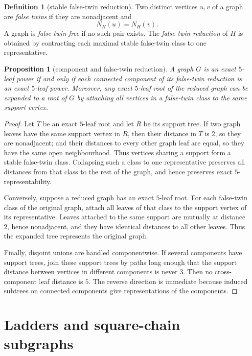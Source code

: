 \documentclass[11pt]{article}
\newtheorem{proposition}[theorem]{Proposition}
\theoremstyle{definition}
\newtheorem{definition}[theorem]{Definition}
\begin{document}
\begin{definition}[stable false-twin reduction]
Two distinct vertices $u,v$ of a graph are \emph{false twins} if they are nonadjacent and
\[
 N_H(u)=N_H(v).
\]
A graph is \emph{false-twin-free} if no such pair exists.  The \emph{false-twin reduction} of $H$ is obtained by contracting each maximal stable false-twin class to one representative.
\end{definition}

\begin{proposition}[component and false-twin reduction]\label{prop:reduction}
A graph $G$ is an exact $5$-leaf power if and only if each connected component of its false-twin reduction is an exact $5$-leaf power.  Moreover, any exact $5$-leaf root of the reduced graph can be expanded to a root of $G$ by attaching all vertices in a false-twin class to the same support vertex.
\end{proposition}

\begin{proof}
Let $T$ be an exact $5$-leaf root and let $R$ be its support tree.  If two graph leaves have the same support vertex in $R$, then their distance in $T$ is $2$, so they are nonadjacent; and their distances to every other graph leaf are equal, so they have the same open neighbourhood.  Thus vertices sharing a support form a stable false-twin class.  Collapsing such a class to one representative preserves all distances from that class to the rest of the graph, and hence preserves exact $5$-representability.

Conversely, suppose a reduced graph has an exact $5$-leaf root.  For each false-twin class of the original graph, attach all leaves of that class to the support vertex of its representative.  Leaves attached to the same support are mutually at distance $2$, hence nonadjacent, and they have identical distances to all other leaves.  Thus the expanded tree represents the original graph.

Finally, disjoint unions are handled componentwise.  If several components have support trees, join these support trees by paths long enough that the support distance between vertices in different components is never $3$.  Then no cross-component leaf distance is $5$.  The reverse direction is immediate because induced subtrees on connected components give representations of the components.
\end{proof}


\section{Ladders and square-chain subgraphs}\label{sec:ladders}
\end{document}
